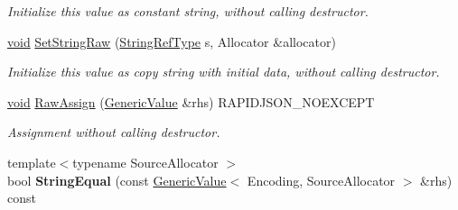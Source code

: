 \begin{DoxyCompactItemize}
\begin{DoxyCompactList}\small\item\em Initialize this value as constant string, without calling destructor. \end{DoxyCompactList}\item 
\hypertarget{class_generic_value_ad3d91db36dfdbfc1af40a79aae07723c}{}\hyperlink{_s_d_l__audio_8h_a52835ae37c4bb905b903cbaf5d04b05f}{void} \hyperlink{class_generic_value_ad3d91db36dfdbfc1af40a79aae07723c}{Set\+String\+Raw} (\hyperlink{class_generic_value_a32e0f30ee278072374c8168b14d3317f}{String\+Ref\+Type} s, Allocator \&allocator)\label{class_generic_value_ad3d91db36dfdbfc1af40a79aae07723c}

\begin{DoxyCompactList}\small\item\em Initialize this value as copy string with initial data, without calling destructor. \end{DoxyCompactList}\item 
\hypertarget{class_generic_value_abb8ea2dfbe74ff4ee7dac6be31317f81}{}\hyperlink{_s_d_l__audio_8h_a52835ae37c4bb905b903cbaf5d04b05f}{void} \hyperlink{class_generic_value_abb8ea2dfbe74ff4ee7dac6be31317f81}{Raw\+Assign} (\hyperlink{class_generic_value}{Generic\+Value} \&rhs) R\+A\+P\+I\+D\+J\+S\+O\+N\+\_\+\+N\+O\+E\+X\+C\+E\+P\+T\label{class_generic_value_abb8ea2dfbe74ff4ee7dac6be31317f81}

\begin{DoxyCompactList}\small\item\em Assignment without calling destructor. \end{DoxyCompactList}\item 
\hypertarget{class_generic_value_a5ff908402687e14f5f14552ec58113a4}{}{\footnotesize template$<$typename Source\+Allocator $>$ }\\bool {\bfseries String\+Equal} (const \hyperlink{class_generic_value}{Generic\+Value}$<$ Encoding, Source\+Allocator $>$ \&rhs) const \label{class_generic_value_a5ff908402687e14f5f14552ec58113a4}

\end{DoxyCompactItemize}
